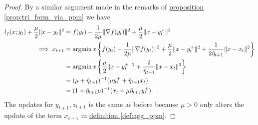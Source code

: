 \documentclass[12pt]{article}
\begin{document}
            \begin{proof}
                By a similar argument made in the remarks of \hyperref[prop:tri_form_via_ppm]{proposition \ref*{prop:tri_form_via_ppm}} we have 
                \begin{align*}
                    l_f(x; y_t) + \frac{\mu}{2}\Vert x - y_t\Vert^2
                    &= 
                    f(y_t) - \frac{1}{2\mu}\Vert \nabla f(y_t)\Vert^2 + \frac{\mu}{2}\Vert x - y_t^+\Vert^2
                    \\
                    \implies 
                    x_{t + 1} &= 
                    \mathop{\rm argmin}\limits{x} 
                    \left\lbrace
                        f(y_t) - \frac{1}{2\mu}\Vert \nabla f(y_t)\Vert^2 + \frac{\mu}{2}\Vert x - y_t^+\Vert^2
                        + 
                        \frac{1}{2\tilde \eta_{t + 1}} \Vert x - x_t\Vert^2
                    \right\rbrace
                    \\
                    &= 
                    \mathop{\rm argmin}\limits{x}
                    \left\lbrace
                        \frac{\mu}{2}\Vert x - y_t^+\Vert^2 + 
                        \frac{2}{\tilde \eta_{t + 1}} \Vert x - x_t\Vert^2
                    \right\rbrace
                    \\
                    &= (\mu + \tilde \eta_{t + 1})^{-1}
                    (\mu y_t^+ + \tilde \eta_{t + 1}x_t)
                    \\
                    &= (1 + \tilde \eta_{t + 1}\mu)^{-1}
                    (x_t + \mu\tilde \eta_{t + 1}y_t^+). 
                \end{align*}
                The updates for $y_{t + 1}, z_{t + 1}$ is the same as before because $\mu > 0$ only alters the update of the term $x_{t + 1}$ in \hyperref[def:agg_ppm]{definition \ref*{def:agg_ppm}}. 
            \end{proof}
            
\end{document}
